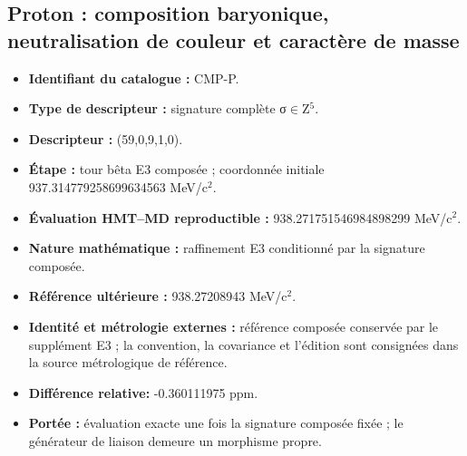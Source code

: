 \subsection{Proton : composition baryonique, neutralisation de couleur et caractère de masse}
\begin{itemize}
\item \textbf{Identifiant du catalogue :} CMP-P.
\item \textbf{Type de descripteur :} signature complète σ\(\in\)Z\({}^{5}\).
\item \textbf{Descripteur :} (59,0,9,1,0).
\item \textbf{Étape :} tour bêta E3 composée ; coordonnée initiale 937.314779\allowbreak{}258699\allowbreak{}634563 MeV/c\({}^{2}\).
\item \textbf{Évaluation HMT--MD reproductible :} 938.271751\allowbreak{}546984\allowbreak{}898299 MeV/c\({}^{2}\).
\item \textbf{Nature mathématique :} raffinement E3 conditionné par la signature composée.
\item \textbf{Référence ultérieure :} 938.272089\allowbreak{}43 MeV/c\({}^{2}\).
\item \textbf{Identité et métrologie externes :} référence composée conservée par le supplément E3 ; la convention, la covariance et l’édition sont consignées dans la source métrologique de référence.
\item \textbf{Différence relative:} -0.360111\allowbreak{}975 ppm.
\item \textbf{Portée :} évaluation exacte une fois la signature composée fixée ; le générateur de liaison demeure un morphisme propre.
\end{itemize}
